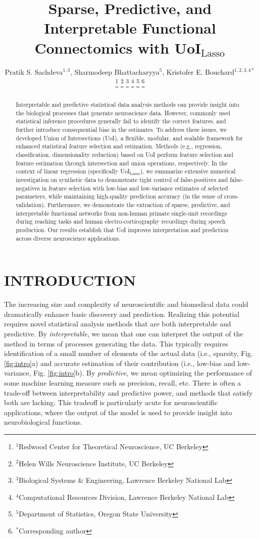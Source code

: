 \documentclass[letterpaper, 10 pt, conference]{ieeeconf}  %
\title{\LARGE \bf
Sparse, Predictive, and Interpretable Functional Connectomics with UoI$_{\text{Lasso}}$
}
\author{
    Pratik S. Sachdeva$^{1, 3}$, Sharmodeep Bhattacharyya$^{5}$, Kristofer E. Bouchard$^{1,2,3,4*}$%
    \thanks{
        $^{1}$Redwood Center for Theoretical Neuroscience, UC Berkeley
    }%
    \thanks{
        $^{2}$Helen Wills Neuroscience Institute, UC Berkeley
    }
    \thanks{
        $^{3}$Biological Systems \& Engineering, Lawrence Berkeley National Lab
    }
    \thanks{
        $^{4}$Computational Resources Division, Lawrence Berkeley National Lab
    }%
    \thanks{
        $^{5}$Department of Statistics, Oregon State University
    }
    \thanks{
        $^*$Corresponding author
    }%
}
\begin{document}
\maketitle
\thispagestyle{empty}
\pagestyle{empty}


\begin{abstract}

Interpretable and predictive statistical data analysis methods can provide insight into the biological processes that generate neuroscience data.  However, commonly used statistical inference procedures generally fail to identify the correct features, and further introduce consequential bias in the estimates. To address these issues, we developed Union of Intersections (UoI), a flexible, modular, and scalable framework for enhanced statistical feature selection and estimation. Methods (e.g., regression, classification, dimensionality reduction) based on UoI perform feature selection and feature estimation through intersection and union operations, respectively. In the context of linear regression (specifically UoI$_{\text{Lasso}}$), we summarize extensive numerical investigation on synthetic data to demonstrate tight control of false-positives and false-negatives in feature selection with low-bias and low-variance estimates of selected parameters, while maintaining high-quality prediction accuracy (in the sense of cross-validation). Furthermore, we demonstrate the extraction of sparse, predictive, and interpretable functional networks from non-human primate single-unit recordings during reaching tasks and human electro-corticography recordings during speech production. Our results establish that UoI improves interpretation and prediction across diverse neuroscience applications. 

\end{abstract}


\section{INTRODUCTION}
The increasing size and complexity of neuroscientific and biomedical data could dramatically enhance basic discovery and prediction. Realizing this potential requires novel statistical analysis methods that are both interpretable and predictive. By \textit{interpretable}, we mean that one can interpret the output of the method in terms of processes generating the data. This typically requires identification of a small number of elements of the actual data (i.e., sparsity, Fig. \ref{fig:intro}a) and accurate estimation of their contribution (i.e., low-bias and low-variance, Fig. \ref{fig:intro}b). By \textit{predictive}, we mean optimizing the performance of some machine learning measure such as precision, recall, etc. There is often a trade-off between interpretability and predictive power, and methods that satisfy both are lacking. This tradeoff is particularly acute for neuroscientific applications, where the output of the model is used to provide insight into neurobiological functions. 
\end{document}
